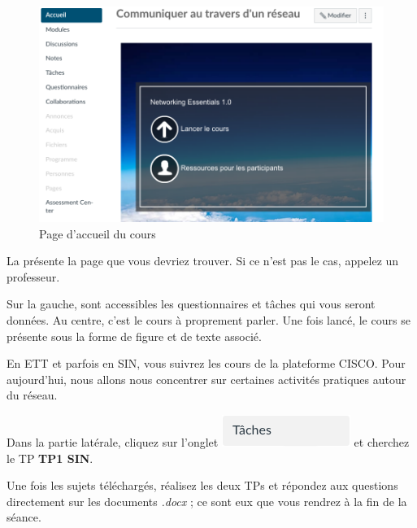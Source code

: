 \documentclass[11pt]{article}
\begin{document}
	\begin{figure}[ht]
		\centering
		\includegraphics[width=.6\textwidth]{Src/Images/page}
		\caption{Page d'accueil du cours}
		\label{fig:page}
	\end{figure}

	La  présente la page que vous devriez trouver. Si ce n'est pas le cas, appelez un professeur.

	Sur la gauche, sont accessibles les questionnaires et tâches qui vous seront données. Au centre, c'est le cours à proprement parler. Une fois lancé, le cours se présente sous la forme de figure et de texte associé.

	En ETT et parfois en SIN, vous suivrez les cours de la plateforme CISCO.
	Pour aujourd'hui, nous allons nous concentrer sur certaines activités pratiques autour du réseau.

	Dans la partie latérale, cliquez sur l'onglet \includegraphics[height=.5cm]{Src/Images/menuLateral} et cherchez le TP \textbf{TP1 SIN}.

	Une fois les sujets téléchargés, réalisez les deux TPs et répondez aux questions directement sur les documents \textit{.docx} ; ce sont eux que vous rendrez à la fin de la séance. 
\end{document}
